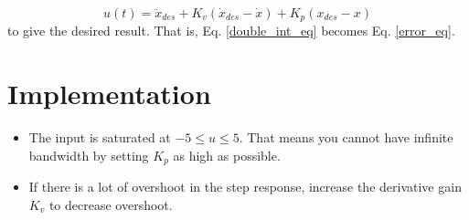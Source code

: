 \documentclass{article}
\begin{document}
	\begin{equation}
	u(t) = \ddot{x}_{des} + K_v(\dot{x}_{des} - \dot{x}) + K_p(x_{des} - x)
	\end{equation}
	to give the desired result. That is, Eq. \ref{double_int_eq} becomes Eq. \ref{error_eq}.
	
	
	\section{Implementation}
	\begin{itemize}
		\item The input is saturated at $-5 \leq u \leq 5$. That means you cannot have infinite bandwidth by setting $K_p$ as high as possible.
		\item If there is a lot of overshoot in the step response, increase the derivative gain $K_v$ to decrease overshoot.
	\end{itemize}
	
\end{document}
